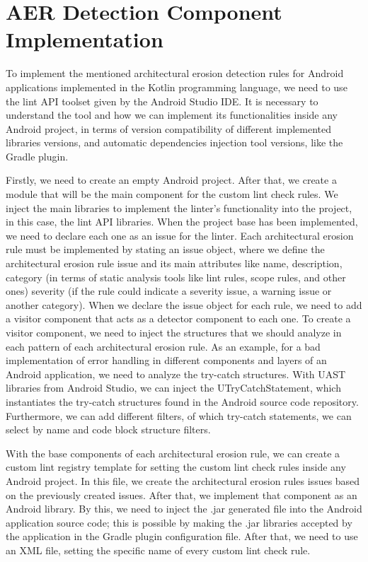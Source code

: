 \section{AER Detection Component Implementation}
To implement the mentioned architectural erosion detection rules for Android applications implemented in the Kotlin programming language, we need to use the lint API toolset given by the Android Studio IDE. It is necessary to understand the tool and how we can implement its functionalities inside any Android project, in terms of version compatibility of different implemented libraries versions, and automatic dependencies injection tool versions, like the Gradle plugin. 

Firstly, we need to create an empty Android project. After that, we create a module that will be the main component for the custom lint check rules. We inject the main libraries to implement the linter's functionality into the project, in this case, the lint API libraries. When the project base has been implemented, we need to declare each one as an issue for the linter. Each architectural erosion rule must be implemented by stating an issue object, where we define the architectural erosion rule issue and its main attributes like name, description, category (in terms of static analysis tools like lint rules, scope rules, and other ones) severity (if the rule could indicate a severity issue, a warning issue or another category). When we declare the issue object for each rule, we need to add a visitor component that acts as a detector component to each one. To create a visitor component, we need to inject the structures that we should analyze in each pattern of each architectural erosion rule. As an example, for a bad implementation of error handling in different components and layers of an Android application, we need to analyze the try-catch structures. With UAST libraries from Android Studio, we can inject the UTryCatchStatement, which instantiates the try-catch structures found in the Android source code repository. Furthermore, we can add different filters, of which try-catch statements, we can select by name and code block structure filters.

With the base components of each architectural erosion rule, we can create a custom lint registry template for setting the custom lint check rules inside any Android project. In this file, we create the architectural erosion rules issues based on the previously created issues. After that, we implement that component as an Android library. By this, we need to inject the .jar generated file into the Android application source code; this is possible by making the .jar libraries accepted by the application in the Gradle plugin configuration file.  After that, we need to use an XML file, setting the specific name of every custom lint check rule.

